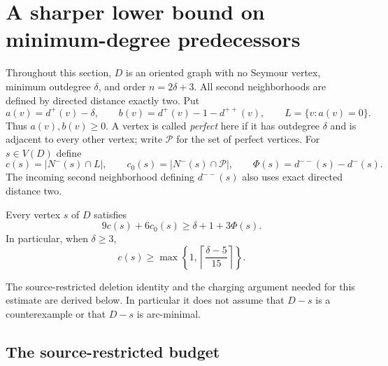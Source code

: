 \section{A sharper lower bound on minimum-degree predecessors}
\label{sec:predecessor-bound}

Throughout this section, $D$ is an oriented graph with no Seymour vertex,
minimum outdegree $\delta$, and order $n=2\delta+3$.  All second
neighborhoods are defined by directed distance exactly two.  Put
\[
 a(v)=d^+(v)-\delta,\qquad
 b(v)=d^+(v)-1-d^{++}(v),\qquad
 L=\{v:a(v)=0\}.
\]
Thus $a(v),b(v)\ge0$.  A vertex is called \emph{perfect} here if it
has outdegree $\delta$ and is adjacent to every other vertex; write
$\mathcal P$ for the set of perfect vertices.  For $s\in V(D)$ define
\[
 c(s)=|N^-(s)\cap L|,\qquad
 c_0(s)=|N^-(s)\cap\mathcal P|,\qquad
 \Phi(s)=d^{--}(s)-d^-(s).
\]
The incoming second neighborhood defining $d^{--}(s)$ also uses exact
directed distance two.

\begin{theorem}\label{thm:predecessor-general}
Every vertex $s$ of $D$ satisfies
\begin{equation}\label{eq:predecessor-general-refined}
 {9c(s)+6c_0(s)\ge\delta+1+3\Phi(s).}
\end{equation}
In particular, when $\delta\ge3$,
\begin{equation}\label{eq:predecessor-general-coarse}
 c(s)\ge
 \max\left\{1,\left\lceil\frac{\delta-5}{15}\right\rceil\right\}.
\end{equation}
\end{theorem}

The source-restricted deletion identity and the charging argument needed for
this estimate are derived below.  In particular it does not assume that
$D-s$ is a counterexample or that $D-s$ is arc-minimal.

\subsection{The source-restricted budget}

